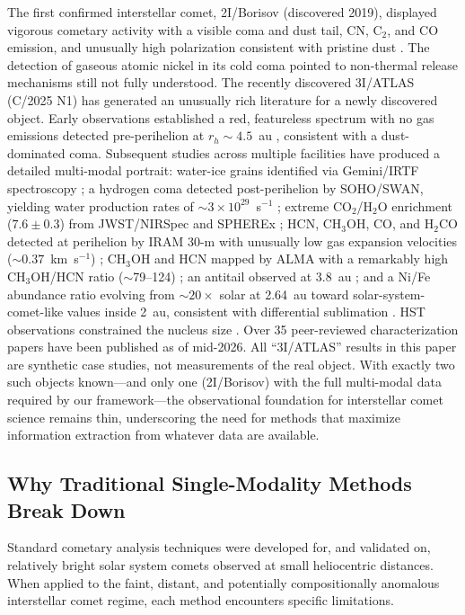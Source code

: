\documentclass[usenatbib]{mnras}
\begin{document}
The first confirmed interstellar comet, 2I/Borisov (discovered 2019), displayed vigorous cometary activity with a visible coma and dust tail, CN, C$_2$, and CO emission, and unusually high polarization consistent with pristine dust \citep{guzik19,jewitt19,fitzsimmons19,bodewits20,bagnulo21}. The detection of gaseous atomic nickel in its cold coma \citep{guzik21} pointed to non-thermal release mechanisms still not fully understood. The recently discovered 3I/ATLAS (C/2025 N1) has generated an unusually rich literature for a newly discovered object. Early observations established a red, featureless spectrum with no gas emissions detected pre-perihelion at $r_h \sim 4.5$~au \citep{opitom20}, consistent with a dust-dominated coma. Subsequent studies across multiple facilities have produced a detailed multi-modal portrait: water-ice grains identified via Gemini/IRTF spectroscopy \citep{yang25}; a hydrogen coma detected post-perihelion by SOHO/SWAN, yielding water production rates of $\sim 3 \times 10^{29}$~s$^{-1}$ \citep{combi26}; extreme CO$_2$/H$_2$O enrichment ($7.6 \pm 0.3$) from JWST/NIRSpec \citep{cordiner25} and SPHEREx \citep{lisse26}; HCN, CH$_3$OH, CO, and H$_2$CO detected at perihelion by IRAM 30-m with unusually low gas expansion velocities ($\sim 0.37$~km~s$^{-1}$) \citep{biver26}; CH$_3$OH and HCN mapped by ALMA with a remarkably high CH$_3$OH/HCN ratio ($\sim$79--124) \citep{roth26}; an antitail observed at 3.8~au \citep{keto26}; and a Ni/Fe abundance ratio evolving from $\sim 20\times$ solar at 2.64~au toward solar-system-comet-like values inside 2~au, consistent with differential sublimation \citep{hutsemekers26}. HST observations constrained the nucleus size \citep{jewitt25}. Over 35 peer-reviewed characterization papers have been published as of mid-2026. All ``3I/ATLAS'' results in this paper are synthetic case studies, not measurements of the real object. With exactly two such objects known---and only one (2I/Borisov) with the full multi-modal data required by our framework---the observational foundation for interstellar comet science remains thin, underscoring the need for methods that maximize information extraction from whatever data are available.

\subsection{Why Traditional Single-Modality Methods Break Down}

Standard cometary analysis techniques were developed for, and validated on, relatively bright solar system comets observed at small heliocentric distances. When applied to the faint, distant, and potentially compositionally anomalous interstellar comet regime, each method encounters specific limitations.
\end{document}
